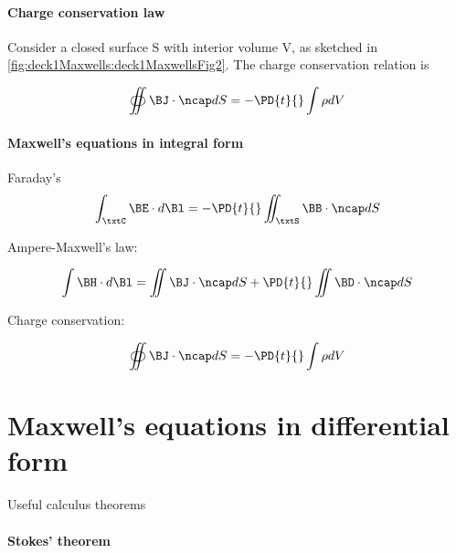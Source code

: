 \paragraph{Charge conservation law}

Consider a closed surface S with interior volume V, as sketched in \cref{fig:deck1Maxwells:deck1MaxwellsFig2}.  The charge conservation relation is


\begin{equation}\label{eqn:uwavesLecture1:60}
\oiint \BJ \cdot \ncap dS = -\PD{t}{} \int \rho dV
\end{equation}

\paragraph{Maxwell's equations in integral form}

Faraday's
\begin{equation}\label{eqn:uwavesLecture1:80}
\int_\txtC \BE \cdot d\Bl = - \PD{t}{} \iint_\txtS \BB \cdot \ncap dS
\end{equation}

Ampere-Maxwell's law:

\begin{equation}\label{eqn:uwavesLecture1:100}
\int \BH \cdot d\Bl = \iint \BJ \cdot \ncap dS + \PD{t}{} \iint \BD \cdot \ncap dS
\end{equation}

Charge conservation:

\begin{equation}\label{eqn:uwavesLecture1:120}
\oiint \BJ \cdot \ncap dS = -\PD{t}{} \int \rho dV
\end{equation}

\section{Maxwell's equations in differential form}

Useful calculus theorems

\paragraph{Stokes' theorem}

